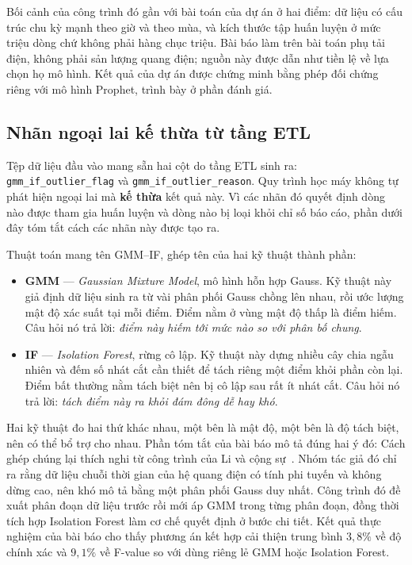 \documentclass[12pt, a4paper]{report}
\begin{document}
Bối cảnh của công trình đó gần với bài toán của dự án ở hai điểm: dữ liệu có cấu trúc
chu kỳ mạnh theo giờ và theo mùa, và kích thước tập huấn luyện ở mức triệu dòng chứ không
phải hàng chục triệu. Bài báo
làm trên bài toán phụ tải điện, không phải sản lượng quang điện; nguồn này được dẫn
như tiền lệ về lựa chọn họ mô hình. Kết quả của dự án được
chứng minh bằng phép đối chứng riêng với mô hình Prophet, trình bày ở phần đánh giá.

\FloatBarrier
\subsection{Nhãn ngoại lai kế thừa từ tầng ETL}

Tệp dữ liệu đầu vào mang sẵn hai cột do tầng ETL sinh ra:
\texttt{gmm\_if\_outlier\_flag} và \texttt{gmm\_if\_outlier\_reason}. Quy trình học máy không tự
phát hiện ngoại lai mà \textbf{kế thừa} kết quả này. Vì các nhãn đó quyết định dòng
nào được tham gia huấn luyện và dòng nào bị loại khỏi chỉ số báo cáo, phần dưới đây tóm
tắt cách các nhãn này được tạo ra.

Thuật toán mang tên GMM--IF, ghép tên của hai kỹ thuật thành phần:

\begin{itemize}
    \item \textbf{GMM} --- \textit{Gaussian Mixture Model}, mô hình hỗn hợp Gauss. Kỹ thuật
    này giả định dữ liệu sinh ra từ vài phân phối Gauss chồng lên nhau, rồi ước lượng
    mật độ xác suất tại mỗi điểm. Điểm nằm ở vùng mật độ thấp là điểm hiếm. Câu hỏi
    nó trả lời: \textit{điểm này hiếm tới mức nào so với phân bố chung}.
    \item \textbf{IF} --- \textit{Isolation Forest}, rừng cô lập. Kỹ thuật này dựng nhiều cây
    chia ngẫu nhiên và đếm số nhát cắt cần thiết để tách riêng một điểm khỏi phần
    còn lại. Điểm bất thường nằm tách biệt nên bị cô lập sau rất ít nhát cắt. Câu hỏi nó trả
    lời: \textit{tách điểm này ra khỏi đám đông dễ hay khó}.
\end{itemize}

Hai kỹ thuật đo hai thứ khác nhau, một bên là mật độ, một bên là độ tách biệt, nên có
thể bổ trợ cho nhau. Phần tóm tắt của bài báo mô tả đúng hai ý đó:
Cách ghép chúng lại thích nghi từ công trình của Li và cộng
sự~\cite{li2025gmmif}. Nhóm tác giả đó chỉ ra rằng dữ liệu chuỗi thời gian của hệ quang điện
có tính phi tuyến và không dừng cao, nên khó mô tả bằng một phân phối Gauss duy nhất. Công
trình đó đề xuất phân đoạn dữ liệu trước rồi mới áp GMM trong từng phân đoạn, đồng
thời tích hợp Isolation Forest làm cơ chế quyết định ở bước chi tiết. Kết quả thực nghiệm
của bài báo cho thấy phương án kết hợp cải thiện trung bình $3{,}8\%$ về độ chính xác và
$9{,}1\%$ về F-value so với dùng riêng lẻ GMM hoặc Isolation Forest.
\end{document}
